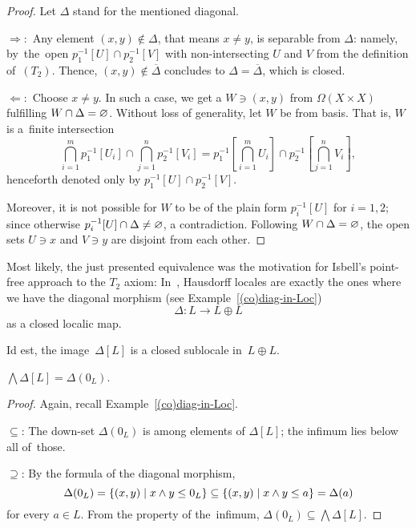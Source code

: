 \begin{proof}
  Let $\Delta$ stand for the mentioned diagonal.

  $\Rightarrow:$ Any element $(x, y)\not\in \Delta$, that means $x \ne y$, is
  separable from $\Delta$:
  namely, by~the~open $p_1^{-1}[U] \cap p_2^{-1}[V]$ with non-intersecting $U$
  and $V$ from the definition of~$(T_2)$.
  Thence, $(x, y)\not\in \overline{\Delta}$ concludes to $\Delta =
  \overline{\Delta}$, which is closed.

  $\Leftarrow:$ Choose $x \ne y$.
  In such a case, we get a $W\owns (x, y)$ from $\Omega(X\times X)$ fulfilling
  $W \cap \Delta = \varnothing$.
  Without loss of generality, let $W$ be from basis.
  That is, $W$ is a~finite intersection
  \[
    \bigcap_{i=1}^m p_1^{-1}[U_i] \cap \bigcap_{j=1}^n p_2^{-1}[V_i] =
    p_1^{-1}[\bigcap_{i=1}^m U_i] \cap p_2^{-1}[\bigcap_{j=1}^n V_i],
  \]
  henceforth denoted only by $p_1^{-1}[U] \cap p_2^{-1}[V]$.

  Moreover, it is not possible for $W$ to be of the plain form $p_i^{-1}[U]$
  for $i = 1, 2$;
  since otherwise $p_i^{-1}[U] \cap \Delta \ne \varnothing$, a contradiction.
  Following $W \cap \Delta = \varnothing$, the open sets $U\owns x$ and $V\owns y$
  are disjoint from each other.
\end{proof}

Most likely, the just presented equivalence was the motivation for Isbell's
point-free approach to the $T_2$ axiom:
In~\cite{isbell72}, Hausdorff locales are exactly the ones where we have the
diagonal morphism (see Example~\ref{(co)diag-in-Loc})
\[
  \Delta\colon L \to L \oplus L
\]
as a closed localic map.

Id est, the image~$\Delta[L]$ is a closed sublocale in~$L \oplus L$.

\begin{lem}
  $\bigwedge \Delta[L] = \Delta(0_L)$.
\end{lem}

\begin{proof}
  Again, recall Example~\ref{(co)diag-in-Loc}\thinspace.

  $\subseteq$: The down-set $\Delta(0_L)$ is among elements of $\Delta[L]$; the
  infimum lies below all of~those.

  $\supseteq$: By the formula of the diagonal morphism,
  \[
    \Delta(0_L)
    = \left\{(x, y) \mid x \wedge y \leq 0_L \right\}
    \subseteq \left\{(x, y) \mid x \wedge y \leq a \right\}
    = \Delta(a)
  \]
  for every $a\in L$.
  From the property of the~infimum, $\Delta(0_L) \subseteq \bigwedge
  \Delta[L]$.
\end{proof}

